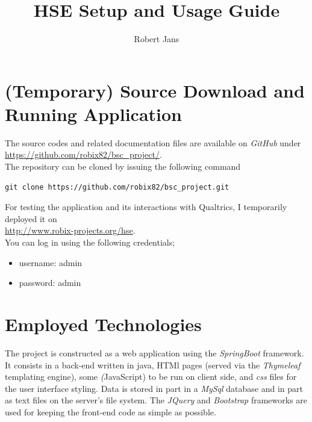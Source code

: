\documentclass[fleqn]{article}
\title{HSE Setup and Usage Guide}
\author{Robert Jans}
\begin{document}
\setlength{\parindent}{0cm}

\maketitle

\newpage

\hypersetup{
  linkcolor=black
}
\tableofcontents
\hypersetup{
  linkcolor=blue
}

\newpage

\section{(Temporary) Source Download and Running Application}

The source codes and related documentation files are available on \emph{GitHub} under \\

\href{https://github.com/robix82/bsc_project/}{https://github.com/robix82/bsc\_project/}. \\

The repository can be cloned by issuing the following command 
\begin{verbatim}
git clone https://github.com/robix82/bsc_project.git
\end{verbatim}

For testing the application and its interactions with Qualtrics, I temporarily deployed it on \\

\url{http://www.robix-projects.org/hse}. \\


You can log in using the following credentials;

\begin{itemize}
\item username: admin
\item password: admin
\end{itemize}

\section{Employed Technologies}

The project is constructed as a web application using the \emph{SpringBoot} framework. It consists in 
a back-end written in java, HTMl pages (served via the \emph{Thymeleaf} templating engine), some
\emph(JavaScript) to be run on client side, and \emph{css} files for the user interface styling. 
Data is stored in part in a \emph{MySql} database and in part as text files
on the server's file system. The \emph{JQuery} and \emph{Bootstrap} frameworks are used for keeping the
front-end code as simple as possible.
\end{document}
